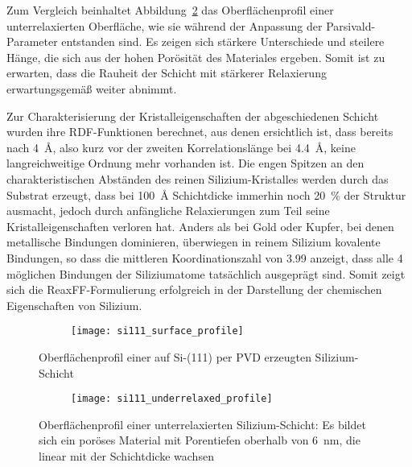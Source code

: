 Zum Vergleich beinhaltet Abbildung~\ref{fig:siliconunderrelaxedprofile} das Oberflächenprofil einer unterrelaxierten Oberfläche, wie sie während der Anpassung der Parsivald-Parameter entstanden sind.
Es zeigen sich stärkere Unterschiede und steilere Hänge, die sich aus der hohen Porösität des Materiales ergeben.
Somit ist zu erwarten, dass die Rauheit der Schicht mit stärkerer Relaxierung erwartungsgemäß weiter abnimmt.

Zur Charakterisierung der Kristalleigenschaften der abgeschiedenen Schicht wurden ihre RDF-Funktionen berechnet, aus denen ersichtlich ist, dass bereits nach \SI{4}{\angstrom}, also kurz vor der zweiten Korrelationslänge bei \SI{4.4}{\angstrom}, keine langreichweitige Ordnung mehr vorhanden ist.
Die engen Spitzen an den charakteristischen Abständen des reinen Silizium-Kristalles werden durch das Substrat erzeugt, dass bei \SI{100}{\angstrom} Schichtdicke immerhin noch \SI{20}{\percent} der Struktur ausmacht, jedoch durch anfängliche Relaxierungen zum Teil seine Kristalleigenschaften verloren hat.
Anders als bei Gold oder Kupfer, bei denen metallische Bindungen dominieren, überwiegen in reinem Silizium kovalente Bindungen, so dass die mittleren Koordinationszahl von \num{3.99} anzeigt, dass alle 4 möglichen Bindungen der Siliziumatome tatsächlich ausgeprägt sind.
Somit zeigt sich die ReaxFF-Formulierung erfolgreich in der Darstellung der chemischen Eigenschaften von Silizium.

\begin{figure}[H]
  \centering
  \captionsetup[subfigure]{singlelinecheck=false}
  \begin{subfigure}[t]{7.1cm}
    \texttt{[image: si111\_surface\_profile]}
  \end{subfigure}
  \begin{subfigure}[t]{1.7cm}
    \def\svgwidth{\textwidth}
    
  \end{subfigure}
  \caption[Oberflächenprofil einer Silizium-PVD-Schicht]{Oberflächenprofil einer auf Si-(111) per PVD erzeugten Silizium-Schicht}
  \label{fig:siliconprofile}
\end{figure}

\begin{figure}[H]
  \centering
  \captionsetup[subfigure]{singlelinecheck=false}
  \begin{subfigure}[t]{7.1cm}
    \texttt{[image: si111\_underrelaxed\_profile]}
  \end{subfigure}
  \begin{subfigure}[t]{1.7cm}
    \def\svgwidth{\textwidth}
    
  \end{subfigure}
  \caption[Oberflächenprofil einer unterrelaxierten Siliziumschicht]{
    Oberflächenprofil einer unterrelaxierten Silizium-Schicht:
    Es bildet sich ein poröses Material mit Porentiefen oberhalb von \SI{6}{\nano\meter}, die linear mit der Schichtdicke wachsen
  }
  \label{fig:siliconunderrelaxedprofile}
\end{figure}

